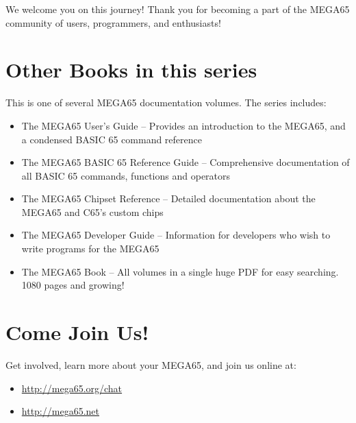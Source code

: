 We welcome you on this journey! Thank you for becoming a part of the MEGA65
community of users, programmers, and enthusiasts!

\section{Other Books in this series}

This is one of several MEGA65 documentation volumes. The series includes:

\begin{itemize}
    \item The MEGA65 User's Guide -- Provides an introduction to the MEGA65, and a condensed BASIC 65 command reference
    \item The MEGA65 BASIC 65 Reference Guide -- Comprehensive documentation of all BASIC 65 commands, functions and operators
    \item The MEGA65 Chipset Reference -- Detailed documentation about the MEGA65 and C65's custom chips
    \item The MEGA65 Developer Guide -- Information for developers who wish to write programs for the MEGA65
    \item The MEGA65 Book -- All volumes in a single huge PDF for easy searching. 1080 pages and growing!
\end{itemize}

\section{Come Join Us!}
Get involved, learn more about your MEGA65, and join us online at:

\begin{itemize}
    \item \url{http://mega65.org/chat}
    \item \url{http://mega65.net}
\end{itemize}
